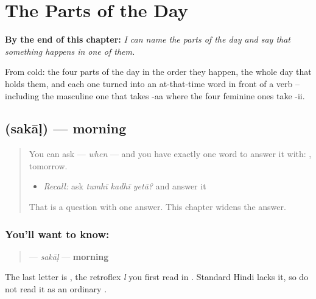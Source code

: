 
\chapter{The Parts of the Day}
\label{ch:mr-divasache-bhag}

\begin{chapteropening}
\textbf{By the end of this chapter:} \emph{I can name the parts of the day and say that something happens in one of them.}

From cold: the four parts of the day in the order they happen, the whole day that holds them, and each one turned into an at-that-time word in front of a verb -- including the masculine one that takes -aa where the four feminine ones take -ii.
\end{chapteropening}

\section[\texorpdfstring{\mr{सकाळ} (sakāḷ)}{सकाळ (sakāḷ)}]{ (sakāḷ) — morning}

\label{lesson:MR-C66-sakal}



\begin{quote}
You can ask \textbf{} — \emph{when} — and you have exactly one word to answer it with: \textbf{}, tomorrow.

\begin{itemize}
\raggedright
  \item \emph{Recall:} ask \emph{tumhī kadhī yetā?} and answer it
\end{itemize}

That is a question with one answer. This chapter widens the answer.
\end{quote}

\subsection*{You'll want to know: }
\begin{quote}
\textbf{} — \emph{sakāḷ} — \textbf{morning}
\end{quote}

The last letter is \textbf{}, the retroflex \emph{l} you first read in \textbf{ }. Standard Hindi lacks it, so do not read it as an ordinary \textbf{}.

